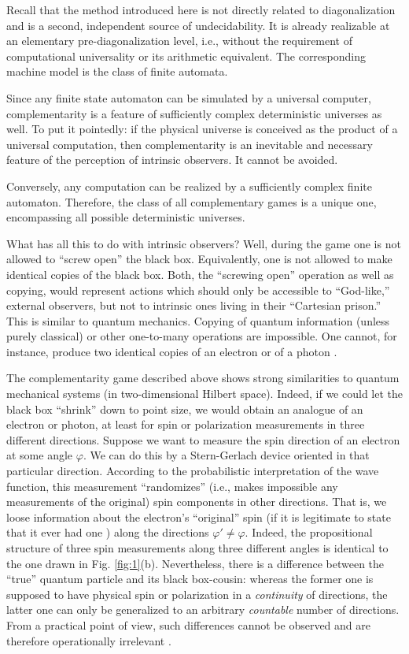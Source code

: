Recall that the method introduced here
 is not directly
related to diagonalization and is a second, independent source of
undecidability. It is already
realizable at an elementary pre-diagonalization level,
 i.e., without
the requirement of computational universality or its arithmetic
equivalent.
The corresponding machine model is the class of finite automata.

Since any finite state
automaton can be simulated by a universal computer, complementarity is a
feature of sufficiently complex deterministic universes as well.
 To put it pointedly: if
the physical
universe is conceived as the product of a universal computation,
then complementarity is an inevitable and necessary feature of the
perception of
intrinsic    observers.
It cannot be avoided.

Conversely, any computation can be realized by a sufficiently complex
finite automaton. Therefore, the class of all complementary games is a
unique one, encompassing all possible deterministic universes.

What has all this to do with intrinsic observers? Well, during the game
one is not allowed to ``screw open'' the black box. Equivalently, one is
not allowed to make identical copies of the black box.
Both, the ``screwing open'' operation as well as copying, would
represent
actions which should only be accessible to ``God-like,'' external
observers, but not to intrinsic ones living in their ``Cartesian
prison.''
This is similar to
quantum mechanics. Copying of quantum
information (unless purely classical) or other one-to-many operations
are impossible. One cannot, for instance, produce two identical
copies of an electron or of a photon \cite{herbert}.

The complementarity game described above shows strong similarities to
quantum
mechanical systems (in two-dimensional Hilbert space).
Indeed, if we could let  the black box ``shrink'' down to point size,
we would obtain an analogue of
an electron or photon, at least for spin or polarization measurements in
three different directions. Suppose we
want to measure the spin direction of
an electron at some angle $\varphi$. We can do this by a Stern-Gerlach
device oriented in that particular direction. According to the
probabilistic interpretation of the wave function, this measurement
``randomizes''  (i.e., makes impossible any measurements of the
original) spin components in other directions. That is,
we loose information about the electron's ``original'' spin (if it is
legitimate to state that it ever had one
\cite{wheeler-Zurek:83,peres-ajp})
along the directions $\varphi' \neq \varphi$. Indeed, the propositional
structure of three spin measurements along three different angles is
identical to the one drawn in Fig. \ref{fig:1}(b).
Nevertheless, there is a difference between the ``true'' quantum
particle and its
black box-cousin: whereas the former one is supposed to have physical
spin or polarization in a {\em continuity} of directions, the latter one
can only be generalized to an arbitrary {\em countable} number of
directions. From a practical point of view, such
differences cannot be observed and are therefore operationally
irrelevant
\cite{bridgman,svozil-set}.


